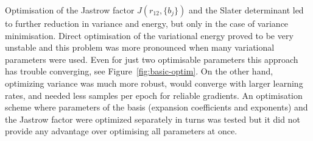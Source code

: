 \documentclass[final,3p,times,twocolumn]{elsarticle}
\begin{document}
	Optimisation of the Jastrow factor $J(r_{12}, \{b_j\})$ and the Slater determinant led to further reduction in variance and energy, but only in the case of variance minimisation. Direct optimisation of the variational energy proved to be very unstable and this problem was more pronounced when many variational parameters were used. Even for just two optimisable parameters this approach has trouble converging, see Figure~\ref{fig:basic-optim}. On the other hand, optimizing variance was much more robust, would converge with larger learning rates, and needed less samples per epoch for reliable gradients. An optimisation scheme where parameters of the basis (expansion coefficients and exponents) and the Jastrow factor were optimized separately in turns was tested but it	did not provide any advantage over optimising all parameters at once.
	\begin{figure}
		 \\

\end{figure}
\end{document}
